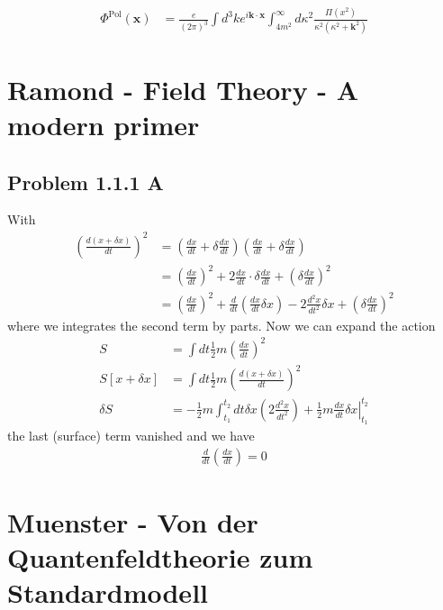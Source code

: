 \documentclass[10pt,a4paper]{book}
\theoremstyle{definition}
\begin{document}
\begin{align}
\Phi^\text{Pol}(\mathbf{x})
&=\frac{e}{(2\pi)^3}\int d^3k e^{i\mathbf{k}\cdot\mathbf{x}}\int_{4m^2}^\infty d\kappa^2\frac{\Pi(x^2)}{\kappa^2(\kappa^2+\mathbf{k}^2)}
\end{align}


\section{{\sc Ramond} - Field Theory - A modern primer} 
\subsection{Problem 1.1.1 A}
With
\begin{align}
\left(\frac{d(x+\delta x)}{dt}\right)^2
&=\left(\frac{dx}{dt}+\delta\frac{dx}{dt}\right)\left(\frac{dx}{dt}+\delta\frac{dx}{dt}\right)\\
&=\left(\frac{dx}{dt}\right)^2+2\frac{dx}{dt}\cdot\delta\frac{dx}{dt}+\left(\delta\frac{dx}{dt}\right)^2\\
&=\left(\frac{dx}{dt}\right)^2+\frac{d}{dt}\left(\frac{dx}{dt}\delta x\right)-2\frac{d^2x}{dt^2}\delta x+\left(\delta\frac{dx}{dt}\right)^2
\end{align}
where we integrates the second term by parts. Now we can expand the action
\begin{align}
S
&=\int dt\frac{1}{2}m\left(\frac{dx}{dt}\right)^2\\
S[x+\delta x]
&=\int dt\frac{1}{2}m\left(\frac{d(x+\delta x)}{dt}\right)^2\\
\delta S&=-\frac{1}{2}m\int_{t_1}^{t_2} dt\delta x\left(2\frac{d^2x}{dt^2}\right)+\left.\frac{1}{2}m\frac{dx}{dt}\delta x\right|_{t_1}^{t_2}
\end{align}
the last (surface) term vanished and we have
\begin{align}
\frac{d}{dt}\left(\frac{dx}{dt}\right)=0
\end{align}

\section{{\sc Muenster} - Von der Quantenfeldtheorie zum Standardmodell} 
\end{document}
